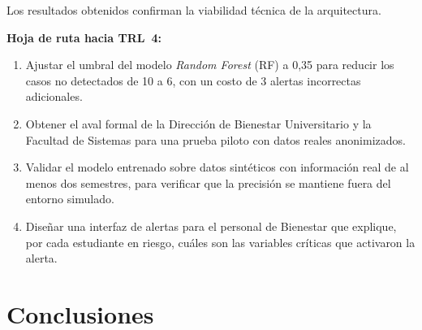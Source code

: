 \documentclass[12pt,letterpaper]{article}
\newcommand{\RF}{\textit{Random Forest} (RF)\xspace}
\begin{document}
Los resultados obtenidos confirman la viabilidad técnica de la arquitectura.

\textbf{Hoja de ruta hacia TRL~4:}
\begin{enumerate}
  \item Ajustar el umbral del modelo \RF a 0,35 para reducir los casos no detectados de 10 a 6, con un costo de 3 alertas incorrectas adicionales.
  \item Obtener el aval formal de la Dirección de Bienestar Universitario y la Facultad de Sistemas para una prueba piloto con datos reales anonimizados.
  \item Validar el modelo entrenado sobre datos sintéticos con información real de al menos dos semestres, para verificar que la precisión se mantiene fuera del entorno simulado.
  \item Diseñar una interfaz de alertas para el personal de Bienestar que explique, por cada estudiante en riesgo, cuáles son las variables críticas que activaron la alerta.
\end{enumerate}

\newpage

\section{Conclusiones}
\end{document}
